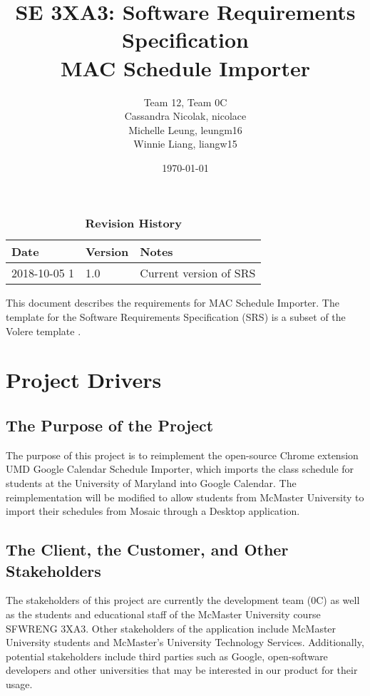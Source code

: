 \documentclass[12pt, titlepage]{article}
\title{SE 3XA3: Software Requirements Specification\\MAC Schedule Importer}
\author{Team 12, Team 0C
		\\ Cassandra Nicolak, nicolace
		\\ Michelle Leung, leungm16
		\\ Winnie Liang, liangw15
}
\date{\today}
\begin{document}
\maketitle

\tableofcontents
\listoftables
\listoffigures


\begin{table}[bp]
\caption{\bf Revision History}
\begin{tabularx}{\textwidth}{p{3cm}p{2cm}X}
\toprule {\bf Date} & {\bf Version} & {\bf Notes}\\
\midrule
2018-10-05 1 & 1.0 & Current version of SRS\\
\bottomrule
\end{tabularx}
\end{table}

\newpage


This document describes the requirements for MAC Schedule Importer.  The template for the Software
Requirements Specification (SRS) is a subset of the Volere
template  \cite{volere}.

\section{Project Drivers}

\subsection{The Purpose of the Project}
\hspace{5mm}The purpose of this project is to reimplement the open-source Chrome extension UMD Google Calendar Schedule Importer, which imports the class schedule for students at the University of Maryland into Google Calendar. The reimplementation will be modified to allow students from McMaster University to import their schedules from Mosaic through a Desktop application.

\subsection{The Client, the Customer, and Other Stakeholders}
\hspace{5mm}The stakeholders of this project are currently the development team (0C) as well as the students and educational staff of the McMaster University course SFWRENG 3XA3. Other stakeholders of the application include McMaster University students and McMaster's University Technology Services.  Additionally, potential stakeholders include third parties such as Google, open-software developers and other universities that may be interested in our product for their usage.
\end{document}
